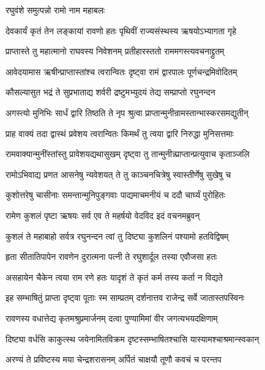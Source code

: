 
\onelineshloka
{रघुवंशे समुत्पन्नो रामो नाम महाबलः}%

\twolineshloka
{देवकार्यं कृतं तेन लङ्कायां रावणो हतः}
{पृथिवीं राज्यसंस्थस्य ऋषयोऽभ्यागता गृहे}%

\twolineshloka
{प्राप्तास्ते तु महात्मानो राघवस्य निवेशनम्}
{प्रतीहारस्ततो राममगस्त्यवचनाद्द्रुतम्}%

\twolineshloka
{आवेदयामास ऋषीन्प्राप्तास्तांश्च त्वरान्वितः}
{दृष्ट्वा रामं द्वारपालः पूर्णचन्द्रमिवोदितम्}%

\twolineshloka
{कौसल्यासुत भद्रं ते सुप्रभाताद्य शर्वरी}
{द्रष्टुमभ्युदयं तेद्य सम्प्राप्तो रघुनन्दन}%

\twolineshloka
{अगस्त्यो मुनिभिः सार्धं द्वारि तिष्ठति ते नृप}
{श्रुत्वा प्राप्तान्मुनीन्रामस्तान्भास्करसमद्युतीन्}%

\twolineshloka
{प्राह वाक्यं तदा द्वास्थं प्रवेशय त्वरान्वितः}
{किमर्थं तु त्वया द्वारि निरुद्धा मुनिसत्तमाः}%

\twolineshloka
{रामवाक्यान्मुनींस्तांस्तु प्रावेशयद्यथासुखम्}
{दृष्ट्वा तु तान्मुनीन्न्प्राप्तान्प्रत्युवाच कृताञ्जलि}%

\twolineshloka
{रामोऽभिवाद्य प्रणत आसनेषु न्यवेशयत्}
{ते तु काञ्चनचित्रेषु स्वास्तीर्णेषु सुखेषु च}%

\twolineshloka
{कुशोत्तरेषु चासीनाः समन्तान्मुनिपुङ्गवाः}
{पाद्यमाचमनीयं च ददौ चार्घ्यं पुरोहितः}%

\twolineshloka
{रामेण कुशलं पृष्टा ऋषयः सर्व एव ते}
{महर्षयो वेदविद इदं वचनमब्रुवन्}%

\twolineshloka
{कुशलं ते महाबाहो सर्वत्र रघुनन्दन}
{त्वां तु दिष्ट्या कुशलिनं पश्यामो हतविद्विषम्}%

\twolineshloka
{हृता सीतातिपापेन रावणेन दुरात्मना}
{पत्नी ते रघुशार्दूल तस्या एवौजसा हतः}%

\twolineshloka
{असहायेन चैकेन त्वया राम रणे हतः}
{यादृशं ते कृतं कर्म तस्य कर्ता न विद्यते}%

\twolineshloka
{इह सम्भाषितुं प्राप्ता दृष्ट्वा पूताः स्म साम्प्रतम्}
{दर्शनात्तव राजेन्द्र सर्वे जातास्तपस्विनः}%

\twolineshloka
{रावणस्य वधात्तेद्य कृतमश्रुप्रमार्जनम्}
{दत्वा पुण्यामिमां वीर जगत्यभयदक्षिणाम्}%

\twolineshloka
{दिष्ट्या वर्धसि काकुत्स्थ जयेनामितविक्रम}
{दृष्टस्सम्भाषितश्चासि यास्यामश्चाश्रमान्स्वकान्}%

\twolineshloka
{अरण्यं ते प्रविष्टस्य मया चेन्द्रशरासनम्}
{अर्पितं चाक्षयौ तूणौ कवचं च परन्तप}%

